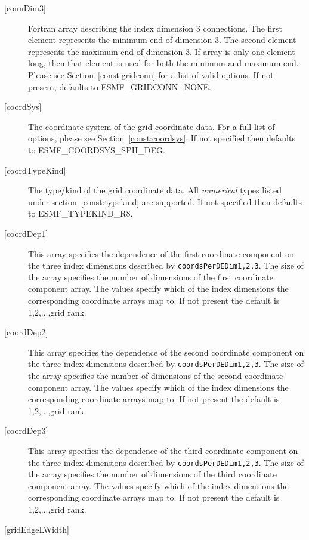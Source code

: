 \begin{description}
   \item[{[connDim3]}]
        Fortran array describing the index dimension 3 connections.
        The first element represents the minimum end of dimension 3.
        The second element represents the maximum end of dimension 3.
        If array is only one element long, then that element is used
        for both the minimum and maximum end.
        Please see Section~\ref{const:gridconn} for a list of valid
        options. If not present, defaults to ESMF\_GRIDCONN\_NONE.
   \item[{[coordSys]}]
       The coordinate system of the grid coordinate data.
       For a full list of options, please see Section~\ref{const:coordsys}.
       If not specified then defaults to ESMF\_COORDSYS\_SPH\_DEG.
   \item[{[coordTypeKind]}]
       The type/kind of the grid coordinate data. All {\em numerical} types
       listed under section~\ref{const:typekind} are supported.
       If not specified then defaults to ESMF\_TYPEKIND\_R8.
   \item[{[coordDep1]}]
       This array specifies the dependence of the first
       coordinate component on the three index dimensions
       described by {\tt coordsPerDEDim1,2,3}. The size of the
       array specifies the number of dimensions of the first
       coordinate component array. The values specify which
       of the index dimensions the corresponding coordinate
       arrays map to. If not present the default is 1,2,...,grid rank.
   \item[{[coordDep2]}]
       This array specifies the dependence of the second
       coordinate component on the three index dimensions
       described by {\tt coordsPerDEDim1,2,3}. The size of the
       array specifies the number of dimensions of the second
       coordinate component array. The values specify which
       of the index dimensions the corresponding coordinate
       arrays map to. If not present the default is 1,2,...,grid rank.
   \item[{[coordDep3]}]
       This array specifies the dependence of the third
       coordinate component on the three index dimensions
       described by {\tt coordsPerDEDim1,2,3}. The size of the
       array specifies the number of dimensions of the third
       coordinate component array. The values specify which
       of the index dimensions the corresponding coordinate
       arrays map to. If not present the default is 1,2,...,grid rank.
   \item[{[gridEdgeLWidth]}]

\end{description}
